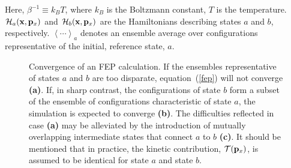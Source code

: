 \noindent Here, $\beta^{-1} \equiv k_B T$, where $k_B$ is the Boltzmann
constant, $T$ is the temperature. ${\cal H}_a({\bf x}, {\bf p}_x)$ and ${\cal
H}_b({\bf x}, {\bf p}_x)$ are the Hamiltonians describing states $a$ and $b$,
respectively. $\left\langle \cdots \right\rangle_a$ denotes an ensemble average
over configurations representative of the initial, reference state, $a$.


\begin{figure}[ht]
  \caption{Convergence of an FEP calculation. If the ensembles representative
           of states $a$ and $b$ are too disparate, equation~({\ref{fep}}) will
           not converge {\bfseries \sffamily (a)}.
           If, in sharp contrast, the configurations of
           state $b$ form a subset of the ensemble of configurations
           characteristic of state $a$, the simulation is expected
           to converge {\bfseries \sffamily (b)}.
           The difficulties reflected in case {\bfseries \sffamily (a)} may be
           alleviated by the introduction of mutually overlapping intermediate
           states that connect $a$ to $b$ {\bfseries \sffamily (c)}. It should be
           mentioned that in practice, the kinetic contribution, ${\cal T}({\bf p}_x)$,
           is assumed to be identical for state $a$ and state $b$.
           \label{fig:overlap}}
\end{figure}


